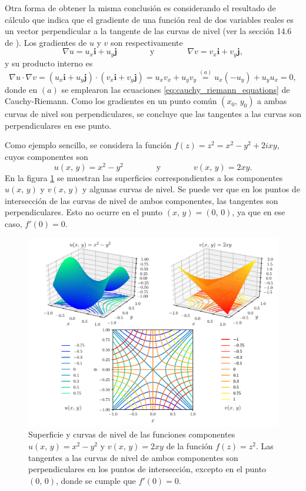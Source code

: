 \documentclass[a4paper]{report}
\begin{document}
Otra forma de obtener la misma conclusión es considerando el resultado de cálculo que indica que el gradiente de una función real de dos variables reales es un vector perpendicular a la tangente de las curvas de nivel (ver la sección 14.6 de \cite{stewart2016essential}). Los gradientes de \(u\) y \(v\) son respectivamente
\[
 \nabla u=u_x\mathbf{i}+u_y\mathbf{j}
 \qquad\qquad\textrm{y}\qquad\qquad
 \nabla v=v_x\mathbf{i}+v_y\mathbf{j},
\]
y su producto interno es
\[
 \nabla u\cdot\nabla v=(u_x\mathbf{i}+u_y\mathbf{j})\cdot(v_x\mathbf{i}+v_y\mathbf{j})
 =u_xv_x+u_yv_y\overset{(a)}{=}u_x(-u_y)+u_yu_x=0,
\]
donde en \((a)\) se emplearon las ecuaciones \ref{eq:cauchy_riemann_equations} de Cauchy-Riemann. Como los gradientes en un punto común \((x_0,\,y_0)\) a ambas curvas de nivel son perpendiculares, se concluye que las tangentes a las curvas son perpendiculares en ese punto.

Como ejemplo sencillo, se considera la función \(f(z)=z^2=x^2-y^2+2ixy\), cuyos componentes son
\[
 u(x,\,y)=x^2-y^2
 \qquad\qquad\textrm{y}\qquad\qquad
 v(x,\,y)=2xy.
\]
En la figura \ref{fig:exercise_27_2_example} se muestran las superficies correspondientes a los componentes \(u(x,\,y)\) y \(v(x,\,y)\) y algunas curvas de nivel. Se puede ver que en los puntos de intersección de las curvas de nivel de ambos componentes, las tangentes son perpendiculares. Esto no ocurre en el punto \((x,\,y)=(0,\,0)\), ya que en ese caso, \(f'(0)=0\).
\begin{figure}[!htb]
 \begin{center}
 \includegraphics[width=\textwidth]{figuras/exercise_27_2_example.pdf}
 \caption{\label{fig:exercise_27_2_example} Superficie y curvas de nivel de las funciones componentes \(u(x,\,y)=x^2-y^2\) y \(v(x,\,y)=2xy\) de la función \(f(z)=z^2\). Las tangentes a las curvas de nivel de ambos componentes son perpendiculares en los puntos de intersección, excepto en el punto \((0,\,0)\), donde se cumple que \(f'(0)=0\).}
 \end{center}
\end{figure}
\end{document}
